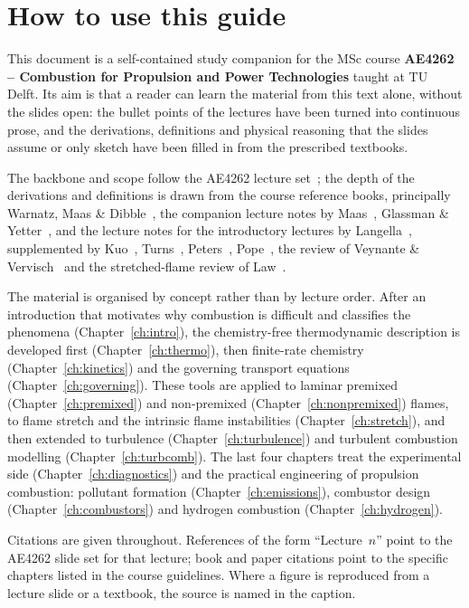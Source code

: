 \chapter*{How to use this guide}

This document is a self-contained study companion for the MSc course \textbf{AE4262 -- Combustion for Propulsion and Power Technologies} taught at TU Delft. Its aim is that a reader can learn the material from this text alone, without the slides open: the bullet points of the lectures have been turned into continuous prose, and the derivations, definitions and physical reasoning that the slides assume or only sketch have been filled in from the prescribed textbooks.

The backbone and scope follow the AE4262 lecture set~\cite{lecture1}; the depth of the derivations and definitions is drawn from the course reference books, principally Warnatz, Maas \& Dibble~\cite{warnatz2006combustion}, the companion lecture notes by Maas~\cite{maas_combustion_lecture}, Glassman \& Yetter~\cite{glassman2014combustion}, and the lecture notes for the introductory lectures by Langella~\cite{Langella_LectureNotes}, supplemented by Kuo~\cite{kuo2005conservation}, Turns~\cite{turns2000introduction}, Peters~\cite{peters2000turbulent}, Pope~\cite{pope2000turbulent}, the review of Veynante \& Vervisch~\cite{veynante2002turbulent} and the stretched-flame review of Law~\cite{Law1988}.

The material is organised by concept rather than by lecture order. After an introduction that motivates why combustion is difficult and classifies the phenomena (Chapter~\ref{ch:intro}), the chemistry-free thermodynamic description is developed first (Chapter~\ref{ch:thermo}), then finite-rate chemistry (Chapter~\ref{ch:kinetics}) and the governing transport equations (Chapter~\ref{ch:governing}). These tools are applied to laminar premixed (Chapter~\ref{ch:premixed}) and non-premixed (Chapter~\ref{ch:nonpremixed}) flames, to flame stretch and the intrinsic flame instabilities (Chapter~\ref{ch:stretch}), and then extended to turbulence (Chapter~\ref{ch:turbulence}) and turbulent combustion modelling (Chapter~\ref{ch:turbcomb}). The last four chapters treat the experimental side (Chapter~\ref{ch:diagnostics}) and the practical engineering of propulsion combustion: pollutant formation (Chapter~\ref{ch:emissions}), combustor design (Chapter~\ref{ch:combustors}) and hydrogen combustion (Chapter~\ref{ch:hydrogen}).

Citations are given throughout. References of the form ``Lecture~$n$'' point to the AE4262 slide set for that lecture; book and paper citations point to the specific chapters listed in the course guidelines. Where a figure is reproduced from a lecture slide or a textbook, the source is named in the caption.
